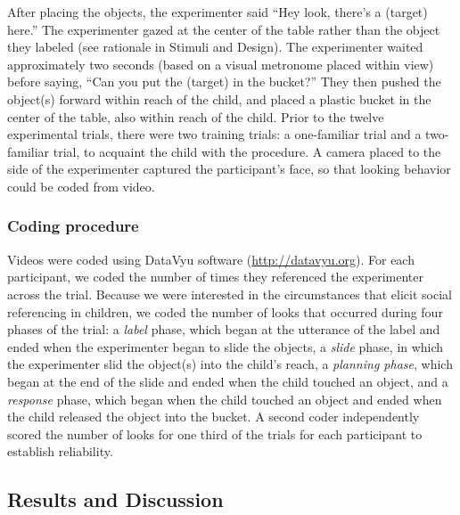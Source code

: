 \documentclass[10pt, letterpaper]{article}
\begin{document}
After placing the objects, the experimenter said ``Hey look, there's a
(target) here.'' The experimenter gazed at the center of the table
rather than the object they labeled (see rationale in Stimuli and
Design). The experimenter waited approximately two seconds (based on a
visual metronome placed within view) before saying, ``Can you put the
(target) in the bucket?'' They then pushed the object(s) forward within
reach of the child, and placed a plastic bucket in the center of the
table, also within reach of the child. Prior to the twelve experimental
trials, there were two training trials: a one-familiar trial and a
two-familiar trial, to acquaint the child with the procedure. A camera
placed to the side of the experimenter captured the participant's face,
so that looking behavior could be coded from video.

\subsubsection{Coding procedure}\label{coding-procedure}

Videos were coded using DataVyu software (\url{http://datavyu.org}). For
each participant, we coded the number of times they referenced the
experimenter across the trial. Because we were interested in the
circumstances that elicit social referencing in children, we coded the
number of looks that occurred during four phases of the trial: a
\emph{label} phase, which began at the utterance of the label and ended
when the experimenter began to slide the objects, a \emph{slide} phase,
in which the experimenter slid the object(s) into the child's reach, a
\emph{planning phase}, which began at the end of the slide and ended
when the child touched an object, and a \emph{response} phase, which
began when the child touched an object and ended when the child released
the object into the bucket. A second coder independently scored the
number of looks for one third of the trials for each participant to
establish reliability.

\subsection{Results and Discussion}\label{results-and-discussion}
\end{document}
